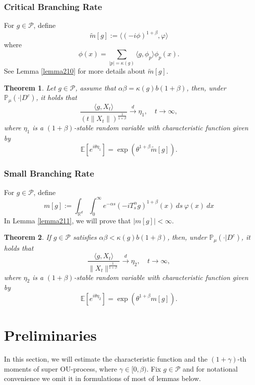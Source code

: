\documentclass[12pt, a4paper]{amsart}
\newtheorem{thm}{Theorem}[section]
\theoremstyle{definition}
\numberwithin{equation}{section}
\begin{document}
\subsubsection{Critical Branching Rate}
For $g\in \mathcal{P}$, define 
$$\tilde{m}[g]:= \langle(-i\phi)^{1+\beta},\varphi\rangle$$
{\color{red}where} 
$$\phi(x)=\sum_{|p|=\kappa(g)}\langle g,\phi_p\rangle\phi_p(x).$$
See Lemma \ref{lemma210} for more details about $\tilde{m}[g]$.
\begin{thm}\label{Theorem12}
Let $g\in\mathcal{P}$, assume that  $\alpha\beta=\kappa(g)b(1+\beta)$, then, under $\mathbb{P}_{\mu}(\cdot|D^c)$, it holds that
$$\frac{\langle g,X_t\rangle}{\left(t\|X_t\|\right)^{\frac{1}{1+\beta}}}\xrightarrow{d} \eta_1, \quad t\rightarrow \infty,$$
where $\eta_1$ is a $(1+\beta)$-stable random variable with characteristic function given by 
$$\mathbb{E} [e^{i\theta \eta_1}]=\exp(\theta^{1+\beta}\tilde{m}[g]).$$
\end{thm}

\subsubsection{Small Branching Rate}

For $g\in \mathcal{P}$, define
$$m[g]:=\int_{\mathbb{R}^d}\int_0^{\infty} e^{-\alpha s}(-iT_{s}^{\alpha}g)^{1+\beta}(x)~ds~\varphi(x)~dx$$
In Lemma \ref{lemma211}, we will prove that $|m[g]|<\infty$.
\begin{thm}\label{Theorem13}
    If $g\in\mathcal{P}$ satisfies  $\alpha\beta<\kappa(g)b(1+\beta)$, then, under $\mathbb{P}_{\mu}(\cdot|D^c)$, it holds that
    $$\frac{\langle g,X_t\rangle}{\|X_t\|^{\frac{1}{1+\beta}}}\xrightarrow{d} \eta_2, \quad t\rightarrow \infty,$$
    where $\eta_2$ is a $(1+\beta)$-stable random variable with characteristic function given by 
    $$\mathbb{E} [e^{i\theta \eta_2}]=\exp(\theta^{1+\beta}m[g]).$$
\end{thm}

\section{Preliminaries}
In this section, we will estimate the characteristic function and the $(1+\gamma)$-th moments of super OU-process, where $\gamma \in [0,\beta)$. Fix $g\in \mathcal{P}$ and for notational convenience we omit it in formulations of most of lemmas below.
\end{document}
